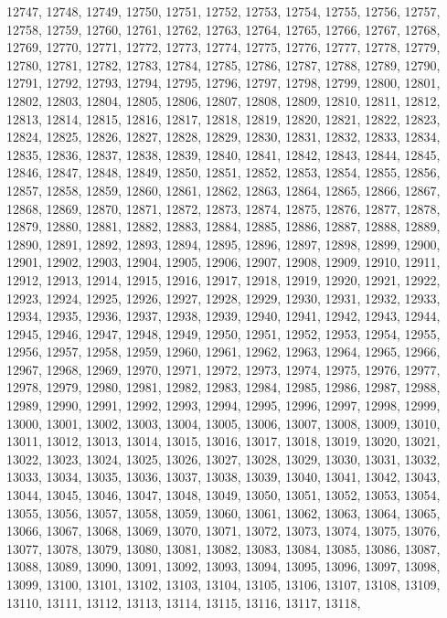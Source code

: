 12747,
12748,
12749,
12750,
12751,
12752,
12753,
12754,
12755,
12756,
12757,
12758,
12759,
12760,
12761,
12762,
12763,
12764,
12765,
12766,
12767,
12768,
12769,
12770,
12771,
12772,
12773,
12774,
12775,
12776,
12777,
12778,
12779,
12780,
12781,
12782,
12783,
12784,
12785,
12786,
12787,
12788,
12789,
12790,
12791,
12792,
12793,
12794,
12795,
12796,
12797,
12798,
12799,
12800,
12801,
12802,
12803,
12804,
12805,
12806,
12807,
12808,
12809,
12810,
12811,
12812,
12813,
12814,
12815,
12816,
12817,
12818,
12819,
12820,
12821,
12822,
12823,
12824,
12825,
12826,
12827,
12828,
12829,
12830,
12831,
12832,
12833,
12834,
12835,
12836,
12837,
12838,
12839,
12840,
12841,
12842,
12843,
12844,
12845,
12846,
12847,
12848,
12849,
12850,
12851,
12852,
12853,
12854,
12855,
12856,
12857,
12858,
12859,
12860,
12861,
12862,
12863,
12864,
12865,
12866,
12867,
12868,
12869,
12870,
12871,
12872,
12873,
12874,
12875,
12876,
12877,
12878,
12879,
12880,
12881,
12882,
12883,
12884,
12885,
12886,
12887,
12888,
12889,
12890,
12891,
12892,
12893,
12894,
12895,
12896,
12897,
12898,
12899,
12900,
12901,
12902,
12903,
12904,
12905,
12906,
12907,
12908,
12909,
12910,
12911,
12912,
12913,
12914,
12915,
12916,
12917,
12918,
12919,
12920,
12921,
12922,
12923,
12924,
12925,
12926,
12927,
12928,
12929,
12930,
12931,
12932,
12933,
12934,
12935,
12936,
12937,
12938,
12939,
12940,
12941,
12942,
12943,
12944,
12945,
12946,
12947,
12948,
12949,
12950,
12951,
12952,
12953,
12954,
12955,
12956,
12957,
12958,
12959,
12960,
12961,
12962,
12963,
12964,
12965,
12966,
12967,
12968,
12969,
12970,
12971,
12972,
12973,
12974,
12975,
12976,
12977,
12978,
12979,
12980,
12981,
12982,
12983,
12984,
12985,
12986,
12987,
12988,
12989,
12990,
12991,
12992,
12993,
12994,
12995,
12996,
12997,
12998,
12999,
13000,
13001,
13002,
13003,
13004,
13005,
13006,
13007,
13008,
13009,
13010,
13011,
13012,
13013,
13014,
13015,
13016,
13017,
13018,
13019,
13020,
13021,
13022,
13023,
13024,
13025,
13026,
13027,
13028,
13029,
13030,
13031,
13032,
13033,
13034,
13035,
13036,
13037,
13038,
13039,
13040,
13041,
13042,
13043,
13044,
13045,
13046,
13047,
13048,
13049,
13050,
13051,
13052,
13053,
13054,
13055,
13056,
13057,
13058,
13059,
13060,
13061,
13062,
13063,
13064,
13065,
13066,
13067,
13068,
13069,
13070,
13071,
13072,
13073,
13074,
13075,
13076,
13077,
13078,
13079,
13080,
13081,
13082,
13083,
13084,
13085,
13086,
13087,
13088,
13089,
13090,
13091,
13092,
13093,
13094,
13095,
13096,
13097,
13098,
13099,
13100,
13101,
13102,
13103,
13104,
13105,
13106,
13107,
13108,
13109,
13110,
13111,
13112,
13113,
13114,
13115,
13116,
13117,
13118,
